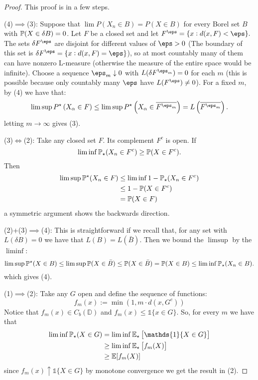 \begin{proof}
	This proof is in a few steps. 
	
	(4)\(\implies\)(3): Suppose that \(\lim P(X_n\in B)= P(X\in B)\) for every Borel set  \(B\) with  \(\P(X\in\delta B) = 0\). Let \(F\) be a closed set and let  \(F^\eps = \{x: d(x,F)<\eps\}.\) The sets \(\delta F^\eps\) are disjoint for different values of  \(\eps > 0\) (The boundary of this set is \(\delta F^\eps = \{x: d(x,F) = \eps\} \)), so at most countably many of them can have nonzero L-measure (otherwise the measure of the entire space would be infinite). Choose a sequence \(\eps_m \downarrow 0\) with  \(L(\delta F^{\eps_m})=0\) for each  \(m\) (this is possible because only countably many \(\eps\) have \(L(F^\eps)\neq 0\)). For a fixed \(m\), by (4) we have that:
	 \[
		 \lim\sup P^\star\left(X_\alpha \in F\right)\leq \lim\sup P^\star\left(X_\alpha \in \overline{F^{\eps_m}}\right) = L\left(\overline{F^{\eps_m}}\right)
	.\]
	letting \(m\to\infty\) gives (3).

	(3)\(\iff\)(2): Take any closed set \(F\). Its complement  \(F^c\) is open. If 
	 \[
		 \lim\inf \P_\star(X_n \in F^c) \geq \P(X \in F^c)
	.\] 
	Then
	\begin{align*}
		\lim\sup \P^\star(X_n \in F) &\leq \lim\inf 1 - \P_\star(X_n \in F^c) \\ 
									   &\leq 1 - \P(X \in F^c)\\
									   &= \P(X \in F)
	\end{align*}
	a symmetric argument shows the backwards direction.
	
	(2)+(3)\(\implies\)(4): This is straightforward if we recall that, for any set with \(L(\delta B)= 0\) we have that \(L(B) = L(\bar{B})\). Then we bound the  \(\limsup\) by the  \(\liminf\):
	 \[
		 \lim\sup \P^\star(X\in B)\leq \lim\sup\P(X \in \bar{B}) \leq \P(X \in \bar{B}) = \P(X\in B) \leq \lim\inf \P_\star(X_n \in B)
	.\] 
	which gives (4).

	(1)\(\implies\)(2): Take any  \(G\) open and define the sequence of functions:
	\begin{equation*}
		f_m(x) := \min(1, m\cdot d(x, G^c))
	\end{equation*}
	Notice that \(f_m(x) \in C_b(\mathbb{D})\) and \(f_m(x) \leq \mathds{1}\{x \in G\}\). So, for every \(m\) we have that
	\begin{align*}
		\lim\inf \P_\star(X\in G) &= \lim\inf \E_\star\left[\mathds{1}\{X\in G\}\right] \\
								  &\geq \lim\inf \E_\star\left[f_m(X) \right]\\
								  &\geq \E[f_m(X)]
	\end{align*}
	since \(f_m(x)\uparrow \mathds{1}\{X\in G\}\) by monotone convergence we get the result in (2).


\end{proof}

